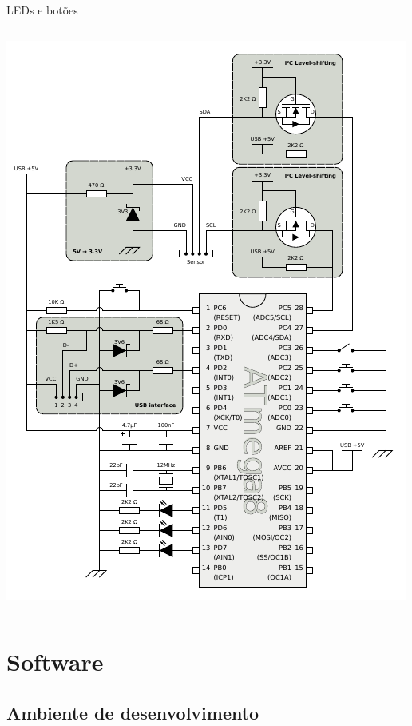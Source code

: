 \documentclass{beamer}
\begin{document}
\begin{frame}{LEDs e botões}
\begin{columns}
		\begin{center}
			\includegraphics[keepaspectratio, width=1.0\textwidth, height=0.8\textheight, clip, viewport=2.00in 1.00in 3.33in 2.56in]{../monografia/img/AVR-magnetometer-usb-mouse.pdf}
		\end{center}
	\end{columns}
\end{frame}


\section{Software}

\subsection{Ambiente de desenvolvimento}
\end{document}
